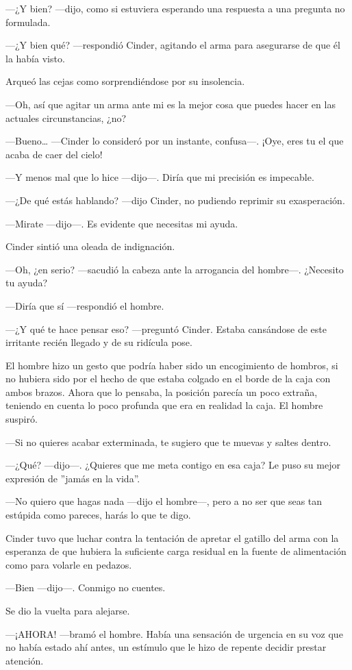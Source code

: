 —¿Y bien? —dijo, como si estuviera esperando una respuesta a una pregunta no formulada. 

—¿Y bien qué? —respondió Cinder, agitando el arma para asegurarse de que él la había visto. 

Arqueó las cejas como sorprendiéndose por su insolencia. 

—Oh, así que agitar un arma ante mi es la mejor cosa que puedes hacer en las actuales circunstancias, ¿no? 

—Bueno… —Cinder lo consideró por un instante, confusa—. ¡Oye, eres tu el que acaba de caer del cielo! 

—Y menos mal que lo hice —dijo—. Diría que mi precisión es impecable. 

—¿De qué estás hablando? —dijo Cinder, no pudiendo reprimir su exasperación. 

—Mirate —dijo—. Es evidente que necesitas mi ayuda. 

Cinder sintió una oleada de indignación. 

—Oh, ¿en serio? —sacudió la cabeza ante la arrogancia del hombre—. ¿Necesito tu ayuda? 

—Diría que sí —respondió el hombre. 

—¿Y qué te hace pensar eso? —preguntó Cinder. Estaba cansándose de este irritante recién llegado y de su ridícula pose. 

El hombre hizo un gesto que podría haber sido un encogimiento de hombros, si no hubiera sido por el hecho de que estaba colgado en el borde de la caja con ambos brazos. Ahora que lo pensaba, la posición parecía un poco extraña, teniendo en cuenta lo poco profunda que era en realidad la caja. El hombre suspiró. 

—Si no quieres acabar exterminada, te sugiero que te muevas y saltes dentro. 

—¿Qué? —dijo—. ¿Quieres que me meta contigo en esa caja? Le puso su mejor expresión de ”jamás en la vida”. 

—No quiero que hagas nada —dijo el hombre—, pero a no ser que seas tan estúpida como pareces, harás lo que te digo. 

Cinder tuvo que luchar contra la tentación de apretar el gatillo del arma con la esperanza de que hubiera la suficiente carga residual en la fuente de alimentación como para volarle en pedazos. 

—Bien —dijo—. Conmigo no cuentes. 

Se dio la vuelta para alejarse. 

—¡AHORA! —bramó el hombre. Había una sensación de urgencia en su voz que no había estado ahí antes, un estímulo que le hizo de repente decidir prestar atención. 

